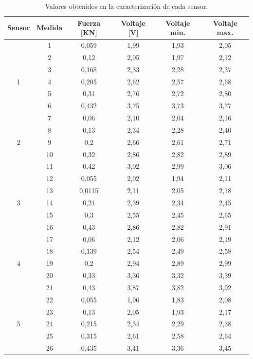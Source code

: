 \begin{table}[H]
\scriptsize
\begin{center}
\begin{tabular}{| c | c | c | c | c | c |}
 \hline
\textbf{Sensor} & \textbf{Medida} & \textbf{Fuerza [KN]} & \textbf{Voltaje [V]} & \textbf{Voltaje min.} & \textbf{Voltaje max.} \\ 
 \hline
                    & 1 & 0,059 & 1,99 & 1,93 & 2,05 \\  
                    & 2 & 0,12 & 2,05 & 1,97 & 2,12 \\
                    & 3 & 0,168 & 2,33 & 2,28 & 2,37 \\
    1               & 4 & 0,205 & 2,62 & 2,57 & 2,68 \\
                    & 5 & 0,31 & 2,76 & 2,72 & 2,80 \\
                    & 6 & 0,432 & 3,75 & 3,73 & 3,77 \\
 \hline
                    & 7 & 0,06 & 2,10 & 2,04 & 2,16 \\
 					& 8 & 0,13 & 2,34 & 2,28 & 2,40 \\
    2               & 9 & 0,2 & 2,66 & 2,61 & 2,71 \\  
 					& 10 & 0,32 & 2,86 & 2,82 & 2,89 \\
 					& 11 & 0,42 & 3,02 & 2,99 & 3,06 \\
 \hline
					& 12 & 0,055 & 2,02 & 1,94 & 2,11 \\
					& 13 & 0,0115 & 2,11 & 2,05 & 2,18 \\
    3				& 14 & 0,21 & 2,39 & 2,34 & 2,45 \\
					& 15 & 0,3 & 2,55 & 2,45 & 2,65 \\
					& 16 & 0,43 & 2,86 & 2,82 & 2,91 \\
 \hline
					& 17 & 0,06 & 2,12 & 2,06 & 2,19 \\  
 					& 18 & 0,139 & 2,54 & 2,49 & 2,58 \\
	4				& 19 & 0,2 & 2,94 & 2,89 & 2,99 \\
					& 20 & 0,33 & 3,36 & 3,32 & 3,39 \\
					& 21 & 0,43 & 3,87 & 3,82 & 3,92 \\
 \hline
					& 22 & 0,055 & 1,96 & 1,83 & 2,08 \\
					& 23 & 0,13 & 2,05 & 1,93 & 2,17 \\
	5				& 24 & 0,215 & 2,34 & 2,29 & 2,38 \\
					& 25 & 0,315 & 2,61 & 2,58 & 2,64 \\
					& 26 & 0,435 & 3,41 & 3,36 & 3,45 \\
 \hline
\end{tabular}
\caption{Valores obtenidos en la caracterización de cada sensor.}
\label{Table:Valores}
\end{center}
\end{table}

